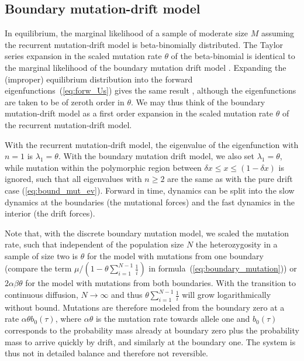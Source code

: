 \documentclass[preprint]{elsarticle}
\begin{document}

\subsection{Boundary mutation-drift model}

In equilibrium, the marginal likelihood of a sample of moderate size $M$ assuming the recurrent mutation-drift model is beta-binomially distributed. The Taylor series expansion in the scaled mutation rate $\theta$ of the beta-binomial is identical to the marginal likelihood of the boundary mutation drift model \citep{Vogl14b}. Expanding the (improper) equilibrium distribution into the forward eigenfunctions~(\ref{eq:forw_Us}) gives the same result \citep{Vogl15}, although the eigenfunctions are taken to be of zeroth order in $\theta$. We may thus think of the boundary mutation-drift model as a first order expansion in the scaled mutation rate $\theta$ of the recurrent mutation-drift model.

With the recurrent mutation-drift model, the eigenvalue of the eigenfunction with $n=1$ is $\lambda_1=\theta$. With the boundary mutation drift model, we also set $\lambda_1=\theta$, while mutation within the polymorphic region between $\delta x \leq x \leq (1-\delta x)$ is ignored, such that all eigenvalues with $n\geq 2$ are the same as with the pure drift case (\ref{eq:bound_mut_ev}). Forward in time, dynamics can be split into the slow dynamics at the boundaries (the mutational forces) and the fast dynamics in the interior (the drift forces). 

Note that, with the discrete boundary mutation model, we scaled the mutation rate, such that independent of the population size $N$ the heterozygosity in a sample of size two is $\theta$ for the model with mutations from one boundary (compare the term $\mu/(1-\theta\sum_{i=1}^{N-1}\frac{1}{i})$ in formula~(\ref{eq:boundary_mutation})) or $2\alpha\beta\theta$ for the model with mutations from both boundaries. With the transition to continuous diffusion, $N\to\infty$ and thus $\theta\sum_{i=1}^{N-1}\frac{1}{i}$ will grow logarithmically without bound. Mutations are therefore modeled from the boundary zero at a rate $\alpha\theta b_0(\tau)$, where $\alpha\theta$ is the mutation rate towards allele one and $b_0(\tau)$ corresponds to the probability mass already at boundary zero plus the probability mass to arrive quickly by drift, and similarly at the boundary one. The system is thus not in detailed balance and therefore not reversible.
\end{document}
